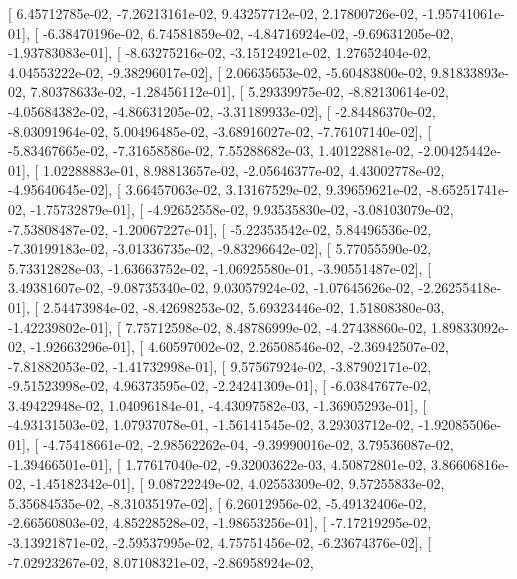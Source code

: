 \documentclass{article}
\begin{document}
       [  6.45712785e-02,  -7.26213161e-02,   9.43257712e-02,
          2.17800726e-02,  -1.95741061e-01],
       [ -6.38470196e-02,   6.74581859e-02,  -4.84716924e-02,
         -9.69631205e-02,  -1.93783083e-01],
       [ -8.63275216e-02,  -3.15124921e-02,   1.27652404e-02,
          4.04553222e-02,  -9.38296017e-02],
       [  2.06635653e-02,  -5.60483800e-02,   9.81833893e-02,
          7.80378633e-02,  -1.28456112e-01],
       [  5.29339975e-02,  -8.82130614e-02,  -4.05684382e-02,
         -4.86631205e-02,  -3.31189933e-02],
       [ -2.84486370e-02,  -8.03091964e-02,   5.00496485e-02,
         -3.68916027e-02,  -7.76107140e-02],
       [ -5.83467665e-02,  -7.31658586e-02,   7.55288682e-03,
          1.40122881e-02,  -2.00425442e-01],
       [  1.02288883e-01,   8.98813657e-02,  -2.05646377e-02,
          4.43002778e-02,  -4.95640645e-02],
       [  3.66457063e-02,   3.13167529e-02,   9.39659621e-02,
         -8.65251741e-02,  -1.75732879e-01],
       [ -4.92652558e-02,   9.93535830e-02,  -3.08103079e-02,
         -7.53808487e-02,  -1.20067227e-01],
       [ -5.22353542e-02,   5.84496536e-02,  -7.30199183e-02,
         -3.01336735e-02,  -9.83296642e-02],
       [  5.77055590e-02,   5.73312828e-03,  -1.63663752e-02,
         -1.06925580e-01,  -3.90551487e-02],
       [  3.49381607e-02,  -9.08735340e-02,   9.03057924e-02,
         -1.07645626e-02,  -2.26255418e-01],
       [  2.54473984e-02,  -8.42698253e-02,   5.69323446e-02,
          1.51808380e-03,  -1.42239802e-01],
       [  7.75712598e-02,   8.48786999e-02,  -4.27438860e-02,
          1.89833092e-02,  -1.92663296e-01],
       [  4.60597002e-02,   2.26508546e-02,  -2.36942507e-02,
         -7.81882053e-02,  -1.41732998e-01],
       [  9.57567924e-02,  -3.87902171e-02,  -9.51523998e-02,
          4.96373595e-02,  -2.24241309e-01],
       [ -6.03847677e-02,   3.49422948e-02,   1.04096184e-01,
         -4.43097582e-03,  -1.36905293e-01],
       [ -4.93131503e-02,   1.07937078e-01,  -1.56141545e-02,
          3.29303712e-02,  -1.92085506e-01],
       [ -4.75418661e-02,  -2.98562262e-04,  -9.39990016e-02,
          3.79536087e-02,  -1.39466501e-01],
       [  1.77617040e-02,  -9.32003622e-03,   4.50872801e-02,
          3.86606816e-02,  -1.45182342e-01],
       [  9.08722249e-02,   4.02553309e-02,   9.57255833e-02,
          5.35684535e-02,  -8.31035197e-02],
       [  6.26012956e-02,  -5.49132406e-02,  -2.66560803e-02,
          4.85228528e-02,  -1.98653256e-01],
       [ -7.17219295e-02,  -3.13921871e-02,  -2.59537995e-02,
          4.75751456e-02,  -6.23674376e-02],
       [ -7.02923267e-02,   8.07108321e-02,  -2.86958924e-02,
\end{document}
